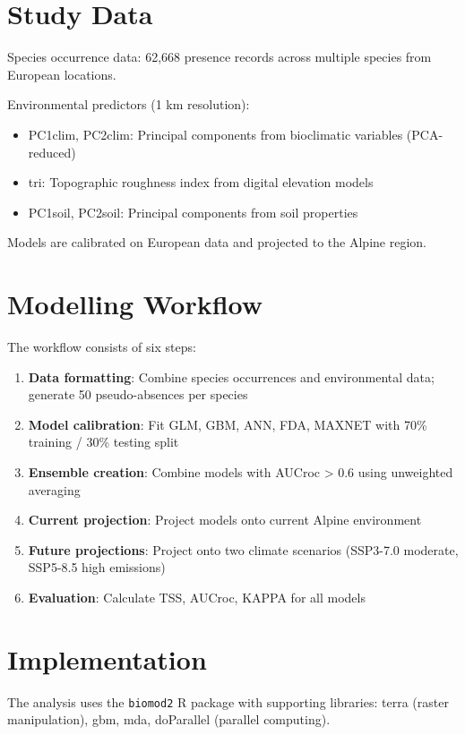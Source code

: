 \documentclass[12pt,a4paper]{report}
\begin{document}
\section{Study Data}

Species occurrence data: 62,668 presence records across multiple species from European locations.

Environmental predictors (1 km resolution):
\begin{itemize}
    \item PC1clim, PC2clim: Principal components from bioclimatic variables (PCA-reduced)
    \item tri: Topographic roughness index from digital elevation models
    \item PC1soil, PC2soil: Principal components from soil properties
\end{itemize}

Models are calibrated on European data and projected to the Alpine region.

\section{Modelling Workflow}

The workflow consists of six steps:

\begin{enumerate}
    \item \textbf{Data formatting}: Combine species occurrences and environmental data; generate 50 pseudo-absences per species
    \item \textbf{Model calibration}: Fit GLM, GBM, ANN, FDA, MAXNET with 70\% training / 30\% testing split
    \item \textbf{Ensemble creation}: Combine models with AUCroc > 0.6 using unweighted averaging
    \item \textbf{Current projection}: Project models onto current Alpine environment
    \item \textbf{Future projections}: Project onto two climate scenarios (SSP3-7.0 moderate, SSP5-8.5 high emissions)
    \item \textbf{Evaluation}: Calculate TSS, AUCroc, KAPPA for all models
\end{enumerate}

\section{Implementation}

The analysis uses the \texttt{biomod2} R package with supporting libraries: terra (raster manipulation), gbm, mda, doParallel (parallel computing).
\end{document}
